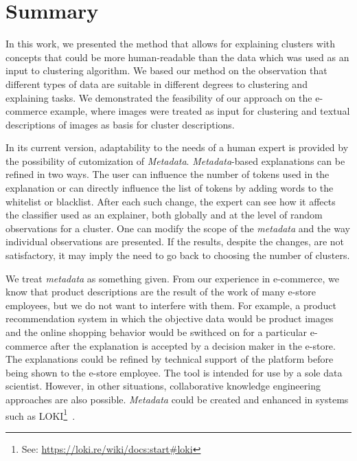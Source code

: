 \documentclass{article}
\begin{document}
\section{Summary}
\label{sec:summary}
In this work, we presented the method that allows for explaining clusters with concepts that could be more human-readable than the data which was used as an input to clustering algorithm.
We based our method on the observation that different types of data are suitable in different degrees to clustering and explaining tasks.
We demonstrated the feasibility of our approach on the e-commerce example, where images were treated as input for clustering and textual descriptions of images as basis for cluster descriptions.

In its current version, adaptability to the needs of a human expert is provided by the possibility of cutomization of \textit{Metadata}.
\textit{Metadata}-based explanations can be refined in two ways.
The user can influence the number of tokens used in the explanation or can directly influence the list of tokens by adding words to the whitelist or blacklist.
After each such change, the expert can see how it affects the classifier used as an explainer, both globally and at the level of random observations for a cluster.
One can modify the scope of the \textit{metadata} and the way individual observations are presented.
If the results, despite the changes, are not satisfactory, it may imply the need to go back to choosing the number of clusters.

We treat \textit{metadata} as something given.
From our experience in e-commerce, we know that product descriptions are the result of the work of many e-store employees, but we do not want to interfere with them.
For example, a product recommendation system in which the objective data would be product images and the online shopping behavior would be swithced on for a particular e-commerce after the explanation is accepted by a decision maker in the e-store.
The explanations could be refined by technical support of the platform before being shown to the e-store employee.
The tool is intended for use by a sole data scientist.
However, in other situations, collaborative knowledge engineering approaches are also possible.
\textit{Metadata} could be created and enhanced in systems such as LOKI\footnote{See: \url{https://loki.re/wiki/docs:start\#loki}}~\cite{Kutt16}.
\end{document}
